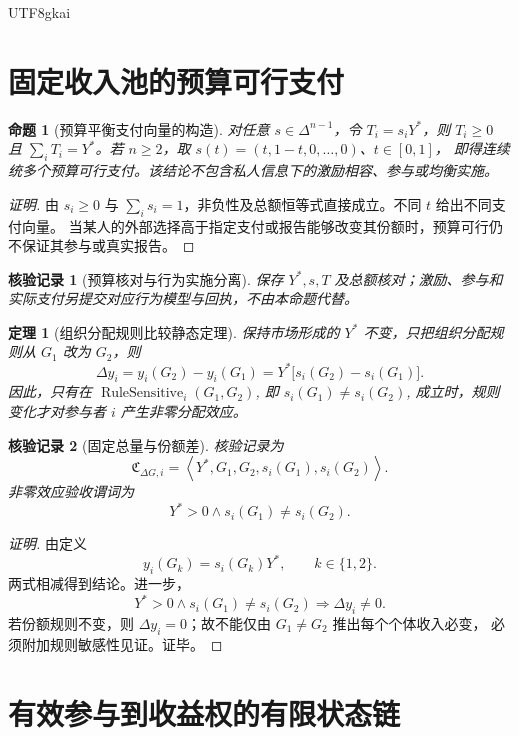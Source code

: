 \documentclass[12pt,a4paper,openany]{report}
\newtheorem{theorem}{定理}[chapter]
\newtheorem{proposition}{命题}[chapter]
\newtheorem{Certificate}{核验记录}[chapter]
\newcommand{\DeltaN}{\Delta^{n-1}}
\newcommand{\Tuple}[1]{\left\langle #1\right\rangle}
\DeclareMathOperator{\RuleSensitive}{RuleSensitive}
\begin{document}
\begin{CJK*}{UTF8}{gkai}
\section{固定收入池的预算可行支付}

\begin{proposition}[预算平衡支付向量的构造]
\label{thm:any-simplex-allocation-implementable}
对任意 \(s\in\DeltaN\)，令 \(T_i=s_iY^*\)，则 \(T_i\ge0\) 且
\(\sum_iT_i=Y^*\)。若 \(n\ge2\)，取 \(s(t)=(t,1-t,0,\ldots,0)\)、\(t\in[0,1]\)，
即得连续统多个预算可行支付。该结论不包含私人信息下的激励相容、参与或均衡实施。
\end{proposition}
\begin{proof}[证明]
由 \(s_i\ge0\) 与 \(\sum_i s_i=1\)，非负性及总额恒等式直接成立。不同 \(t\) 给出不同支付向量。
当某人的外部选择高于指定支付或报告能够改变其份额时，预算可行仍不保证其参与或真实报告。
\end{proof}
\begin{Certificate}[预算核对与行为实施分离]
\label{cert:any-simplex-allocation-implementable}
保存 \(Y^*,s,T\) 及总额核对；激励、参与和实际支付另提交对应行为模型与回执，不由本命题代替。
\end{Certificate}

\begin{theorem}[组织分配规则比较静态定理]
\label{thm:governance-comparative-statics}
保持市场形成的 \(Y^*\) 不变，只把组织分配规则从 \(G_1\) 改为 \(G_2\)，则
\[
  \Delta y_i
  =
  y_i(G_2)-y_i(G_1)
  =
  Y^*\bigl[s_i(G_2)-s_i(G_1)\bigr].
\]
因此，只有在 \(\RuleSensitive_i(G_1,G_2)\), 即
\(s_i(G_1)\ne s_i(G_2)\), 成立时，规则变化才对参与者 \(i\) 产生非零分配效应。
\end{theorem}

\begin{Certificate}[固定总量与份额差]
核验记录为
\[
  \mathfrak C_{\Delta G,i}
  =
  \Tuple{Y^*,G_1,G_2,s_i(G_1),s_i(G_2)}.
\]
非零效应验收谓词为
\[
  Y^*>0\wedge s_i(G_1)\ne s_i(G_2).
\]
\end{Certificate}

\begin{proof}[证明]
由定义
\[
  y_i(G_k)=s_i(G_k)Y^*,\qquad k\in\{1,2\}.
\]
两式相减得到结论。进一步，
\[
  Y^*>0\wedge s_i(G_1)\ne s_i(G_2)
  \Longrightarrow
  \Delta y_i\ne0.
\]
若份额规则不变，则 \(\Delta y_i=0\)；故不能仅由 \(G_1\ne G_2\) 推出每个个体收入必变，
必须附加规则敏感性见证。证毕。
\end{proof}

\section{有效参与到收益权的有限状态链}


\end{CJK*}
\end{document}
